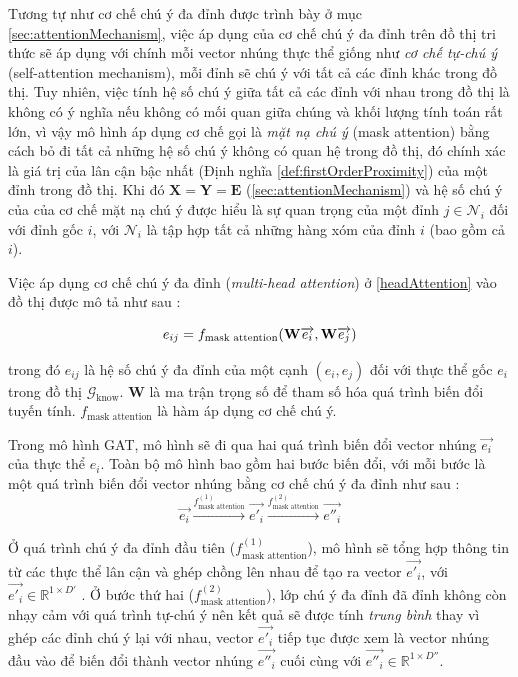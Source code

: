 Tương tự như cơ chế chú ý đa đỉnh được trình bày ở mục \ref{sec:attentionMechanism}, việc áp dụng của cơ chế chú ý đa đỉnh trên đồ thị tri thức sẽ áp dụng với chính mỗi vector nhúng thực thể giống như \textit{cơ chế tự-chú ý} (self-attention mechanism), mỗi đỉnh sẽ chú ý với tất cả các đỉnh khác trong đồ thị. Tuy nhiên, việc tính hệ số chú ý giữa tất cả các đỉnh với nhau trong đồ thị là không có ý nghĩa nếu không có mối quan giữa chúng và khối lượng tính toán rất lớn, vì vậy mô hình áp dụng cơ chế gọi là \textit{mặt nạ chú ý} (mask attention) bằng cách bỏ đi tất cả những hệ số chú ý không có quan hệ trong đồ thị, đó chính xác là giá trị của lân cận bậc nhất (Định nghĩa \ref{def:firstOrderProximity}) của một đỉnh trong đồ thị. Khi đó $\mathbf{X} = \mathbf{Y} = \mathbf{E}$ (\ref{sec:attentionMechanism}) và hệ số chú ý của của cơ chế mặt nạ chú ý được hiểu là sự quan trọng của một đỉnh $j \in \mathcal{N}_{i}$ đối với đỉnh gốc $i$, với $\mathcal{N}_{i}$ là tập hợp tất cả những hàng xóm của đỉnh $i$ (bao gồm cả $i$). 

Việc áp dụng cơ chế chú ý đa đỉnh (\textit{multi-head attention}) ở \ref{headAttention} vào đồ thị được mô tả như sau :

\begin{equation}
\label{maskAttention}
\centering
{e_{ij}}={f_{\text{mask attention}}(\mathbf{W} \overrightarrow{e_i}, \mathbf{W} \overrightarrow{e_j})}
\end{equation}

trong đó $e_{ij}$ là hệ số chú ý đa đỉnh của một cạnh $(e_i, e_j)$ đối với thực thể gốc $e_i$ trong đồ thị $\mathcal{G}_{\text{know}}$. $\mathbf{W}$ là ma trận trọng số để tham số hóa quá trình biến đổi tuyến tính. $f_{\text{mask attention}}$ là hàm áp dụng cơ chế chú ý.

Trong mô hình GAT, mô hình sẽ đi qua hai quá trình biến đổi vector nhúng $\overrightarrow{e_i}$ của thực thể $e_i$. Toàn bộ mô hình bao gồm hai bước biến đổi, với mỗi bước là một quá trình biến đổi vector nhúng bằng cơ chế chú ý đa đỉnh như sau :
\begin{equation}
\label{gatProcess}
\overrightarrow{e_i} \xrightarrow{f_{\text{mask attention}}^{(1)}} \overrightarrow{e'_i} \xrightarrow{f_{\text{mask attention}}^{(2)}} \overrightarrow{e''_i}
\end{equation}

Ở quá trình chú ý đa đỉnh đầu tiên ($f_{\text{mask attention}}^{(1)}$), mô hình sẽ tổng hợp thông tin từ các thực thể lân cận và ghép chồng lên nhau để tạo ra vector $\overrightarrow{e'_i}$, với $\overrightarrow{e'_i} \in \mathbb{R}^{1 \times D'}$ . Ở bước thứ hai ($f_{\text{mask attention}}^{(2)}$), lớp chú ý đa đỉnh đã đỉnh không còn nhạy cảm với quá trình tự-chú ý nên kết quả sẽ được tính \textit{trung bình} thay vì ghép các đỉnh chú ý lại với nhau, vector $\overrightarrow{e'_i}$ tiếp tục được xem là vector nhúng đầu vào để biến đổi thành vector nhúng $\overrightarrow{e''_i}$ cuối cùng với $\overrightarrow{e''_i} \in \mathbb{R}^{1 \times D''}$.

